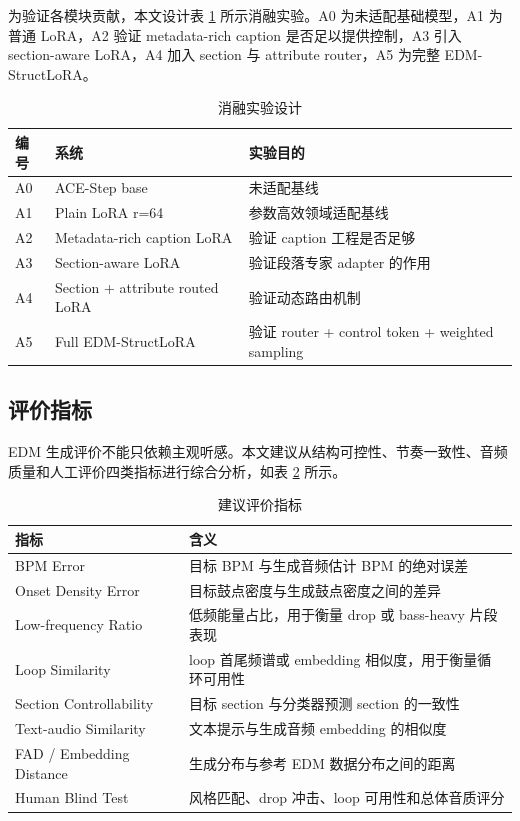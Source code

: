 \documentclass[UTF8,a4paper,zihao=-4,fontset=none]{ctexart}
\newcommand{\modelname}{EDM-StructLoRA}
\begin{document}
为验证各模块贡献，本文设计表 \ref{tab:ablation} 所示消融实验。A0 为未适配基础模型，A1 为普通 LoRA，A2 验证 metadata-rich caption 是否足以提供控制，A3 引入 section-aware LoRA，A4 加入 section 与 attribute router，A5 为完整 \modelname。

\begin{table}[H]
  \centering
  \caption{消融实验设计}
  \label{tab:ablation}
  \begin{tabular}{lll}
    \toprule
    编号 & 系统 & 实验目的 \\
    \midrule
    A0 & ACE-Step base & 未适配基线 \\
    A1 & Plain LoRA r=64 & 参数高效领域适配基线 \\
    A2 & Metadata-rich caption LoRA & 验证 caption 工程是否足够 \\
    A3 & Section-aware LoRA & 验证段落专家 adapter 的作用 \\
    A4 & Section + attribute routed LoRA & 验证动态路由机制 \\
    A5 & Full EDM-StructLoRA & 验证 router + control token + weighted sampling \\
    \bottomrule
  \end{tabular}
\end{table}

\subsection{评价指标}

EDM 生成评价不能只依赖主观听感。本文建议从结构可控性、节奏一致性、音频质量和人工评价四类指标进行综合分析，如表 \ref{tab:metrics} 所示。

\begin{table}[H]
  \centering
  \caption{建议评价指标}
  \label{tab:metrics}
  \begin{tabular}{lp{9.2cm}}
    \toprule
    指标 & 含义 \\
    \midrule
    BPM Error & 目标 BPM 与生成音频估计 BPM 的绝对误差 \\
    Onset Density Error & 目标鼓点密度与生成鼓点密度之间的差异 \\
    Low-frequency Ratio & 低频能量占比，用于衡量 drop 或 bass-heavy 片段表现 \\
    Loop Similarity & loop 首尾频谱或 embedding 相似度，用于衡量循环可用性 \\
    Section Controllability & 目标 section 与分类器预测 section 的一致性 \\
    Text-audio Similarity & 文本提示与生成音频 embedding 的相似度 \\
    FAD / Embedding Distance & 生成分布与参考 EDM 数据分布之间的距离 \\
    Human Blind Test & 风格匹配、drop 冲击、loop 可用性和总体音质评分 \\
    \bottomrule
  \end{tabular}
\end{table}
\end{document}
